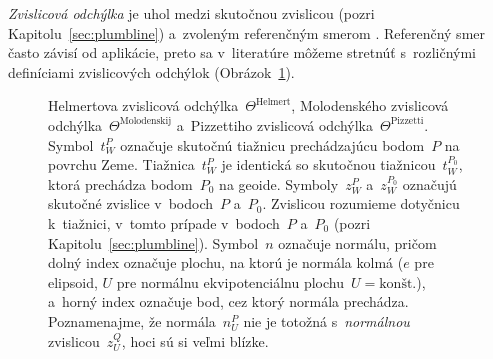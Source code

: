 \documentclass[a4paper, 12pt]{book}
\begin{document}
\emph{Zvislicová odchýlka} je uhol medzi skutočnou zvislicou (pozri 
Kapitolu~\ref{sec:plumbline}) a~zvoleným referenčným smerom 
\parencite{TorgeGeodesy}.  Referenčný smer často závisí od aplikácie, preto sa 
v~literatúre môžeme stretnúť s~rozličnými definíciami zvislicových odchýlok 
(Obrázok~\ref{fig:deflections}).

\begin{figure}[bt]
\centering

\caption{Helmertova zvislicová odchýlka~$\Theta^\textrm{Helmert}$, Molodenského 
zvislicová odchýlka~$\Theta^\textrm{Molodenskij}$ a~Pizzettiho zvislicová 
odchýlka~$\Theta^\textrm{Pizzetti}$.  Symbol~$t_W^P$ označuje skutočnú tiažnicu 
prechádzajúcu bodom~$P$ na povrchu Zeme.  Tiažnica~$t_W^P$ je identická so 
skutočnou tiažnicou~$t_W^{P_0}$, ktorá prechádza bodom~$P_0$ na geoide.  
Symboly~$z_W^P$ a~$z_W^{P_0}$ označujú skutočné zvislice v~bodoch~$P$ a~$P_0$.  
Zvislicou rozumieme dotyčnicu k~tiažnici, v~tomto prípade v~bodoch~$P$ a~$P_0$ 
(pozri Kapitolu~\ref{sec:plumbline}).  Symbol~$n$ označuje normálu, pričom 
dolný index označuje plochu, na ktorú je normála kolmá ($e$ pre elipsoid, $U$ 
pre normálnu ekvipotenciálnu plochu~$U = \textrm{kon\v{s}t.}$), a~horný index 
označuje bod, cez ktorý normála prechádza.  Poznamenajme, že normála~$n_U^P$ 
nie je totožná s~\emph{normálnou} zvislicou~$z_U^Q$, hoci sú si veľmi blízke.}
\label{fig:deflections}
\end{figure}
\end{document}
